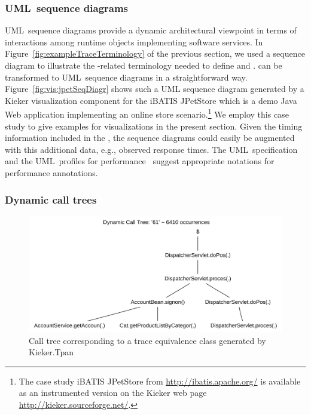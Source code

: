 \subsubsection{UML~sequence diagrams}

UML~sequence diagrams provide a dynamic architectural viewpoint in terms %
of interactions among runtime objects implementing software services. %
In Figure~\ref{fig:exampleTraceTerminology} of the previous section, we used %
a sequence diagram to illustrate the \trace{}-related terminology needed to define %
\executionTraces{} and \messageTraces{}. %
\MessageTraces{} can be transformed to UML~sequence diagrams in a straightforward way. %
Figure~\ref{fig:vis:jpetSeqDiagr} shows such a UML sequence diagram generated by %
a Kieker visualization component for the iBATIS JPetStore which is a demo Java Web application implementing an
online store scenario.\footnote{The case study iBATIS JPetStore from \url{http://ibatis.apache.org/} is available as an instrumented version on the Kieker web page \url{http://kieker.sourceforge.net/}.} We employ this case study to give examples for visualizations in the present section. %
Given the timing information included in the \executionTraces{}, the sequence diagrams %
could easily be augmented with this additional data, e.g., observed response %
times. The UML~specification~\citep{OMG2007UML22Superstructure} and %
the UML~profiles for performance~\citep{OMG2005UMLProfileForSchedulabilityPerformanceAndTimeV1-1,OMG2008UMLProfileForMARTEBeta2} %
suggest appropriate notations for performance annotations. %

\subsubsection{Dynamic call trees}

\begin{figure}\centering
\includegraphics[width=\columnwidth]{figures/20090710-163529-jpetstore-250Threads-400sDuration-200sRampup-dynamicCallTree61}
\caption{Call tree corresponding to a trace equivalence class generated by Kieker.Tpan}
\label{fig:vis:jpetDepCallTree}
\end{figure}

